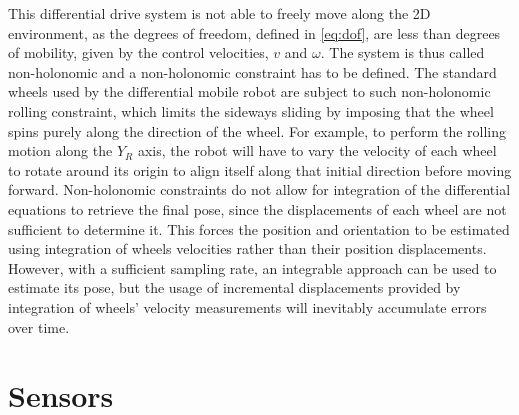 \noindent
This differential drive system is not able to freely move along the \gls{2D} environment, as the degrees of freedom, defined in \eqref{eq:dof}, are less than degrees of mobility, given by the control velocities, $v$ and $\omega$.
The system is thus called non-holonomic and a non-holonomic constraint has to be defined.
The standard wheels used by the differential mobile robot are subject to such non-holonomic rolling constraint, which limits the sideways sliding by imposing that the wheel spins purely along the direction of the wheel.
For example, to perform the rolling motion along the $Y_R$ axis, the robot will have to vary the velocity of each wheel to rotate around its origin to align itself along that initial direction before moving forward.
Non-holonomic constraints do not allow for integration of the differential equations to retrieve the final pose, since the displacements of each wheel are not sufficient to determine it.
This forces the position and orientation to be estimated using integration of wheels velocities rather than their position displacements.
However, with a sufficient sampling rate, an integrable approach can be used to estimate its pose, but the usage of incremental displacements provided by integration of wheels' velocity measurements will inevitably accumulate errors over time.


\section{Sensors}



